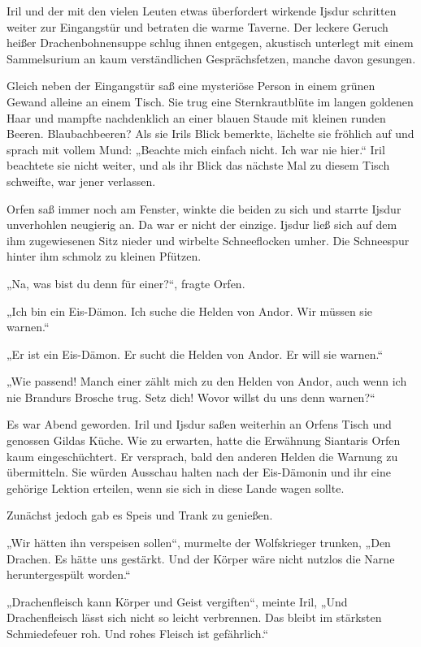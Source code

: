 Iril und der mit den vielen Leuten etwas überfordert wirkende Ijsdur schritten weiter zur Eingangstür und betraten die warme Taverne. Der leckere Geruch heißer Drachenbohnensuppe schlug ihnen entgegen, akustisch unterlegt mit einem Sammelsurium an kaum verständlichen Gesprächsfetzen, manche davon gesungen. 

Gleich neben der Eingangstür saß eine mysteriöse Person in einem grünen Gewand alleine an einem Tisch. Sie trug eine Sternkrautblüte im langen goldenen Haar und mampfte nachdenklich an einer blauen Staude mit kleinen runden Beeren. Blaubachbeeren? Als sie Irils Blick bemerkte, lächelte sie fröhlich auf und sprach mit vollem Mund: „Beachte mich einfach nicht. Ich war nie hier.“ Iril beachtete sie nicht weiter, und als ihr Blick das nächste Mal zu diesem Tisch schweifte, war jener verlassen.

Orfen saß immer noch am Fenster, winkte die beiden zu sich und starrte Ijsdur unverhohlen neugierig an. Da war er nicht der einzige. Ijsdur ließ sich auf dem ihm zugewiesenen Sitz nieder und wirbelte Schneeflocken umher. Die Schneespur hinter ihm schmolz zu kleinen Pfützen.

„Na, was bist du denn für einer?“, fragte Orfen.

„Ich bin ein Eis-Dämon. Ich suche die Helden von Andor. Wir müssen sie warnen.“

„Er ist ein Eis-Dämon. Er sucht die Helden von Andor. Er will sie warnen.“

„Wie passend! Manch einer zählt mich zu den Helden von Andor, auch wenn ich nie Brandurs Brosche trug. Setz dich! Wovor willst du uns denn warnen?“\bigskip







Es war Abend geworden. Iril und Ijsdur saßen weiterhin an Orfens Tisch und genossen Gildas Küche. Wie zu erwarten, hatte die Erwähnung Siantaris Orfen kaum eingeschüchtert. Er versprach, bald den anderen Helden die Warnung zu übermitteln. Sie würden Ausschau halten nach der Eis-Dämonin und ihr eine gehörige Lektion erteilen, wenn sie sich in diese Lande wagen sollte.

Zunächst jedoch gab es Speis und Trank zu genießen.

„Wir hätten ihn verspeisen sollen“, murmelte der Wolfskrieger trunken, „Den Drachen. Es hätte uns gestärkt. Und der Körper wäre nicht nutzlos die Narne heruntergespült worden.“

„Drachenfleisch kann Körper und Geist vergiften“, meinte Iril, „Und Drachenfleisch lässt sich nicht so leicht verbrennen. Das bleibt im stärksten Schmiedefeuer roh. Und rohes Fleisch ist gefährlich.“


